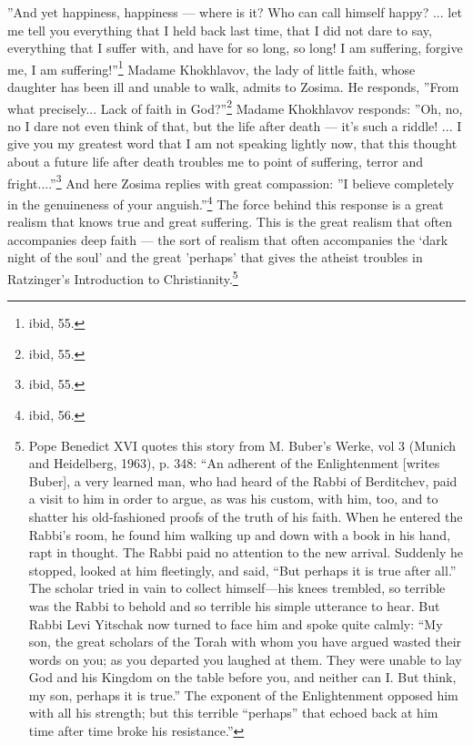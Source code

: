''And yet happiness, happiness --- where is it? Who can call himself happy? ... let me tell you everything that I held back last time, that I did not dare to say, everything that I suffer with, and have for so long, so long! I am suffering, forgive me, I am suffering!''\footnote{ibid, 55.} Madame Khokhlavov, the lady of little faith, whose daughter has been ill and unable to walk, admits to Zosima. He responds, ''From what precisely... Lack of faith in God?''\footnote{ibid, 55.} Madame Khokhlavov responds: ''Oh, no, no I dare not even think of that, but the life after death --- it's such a riddle! ... I give you my greatest word that I am not speaking lightly now, that this thought about a future life after death troubles me to point of suffering, terror and fright....''\footnote{ibid, 55.} And here Zosima replies with great compassion: ''I believe completely in the genuineness of your anguish.''\footnote{ibid, 56.} The force behind this response is a great realism that knows true and great suffering. This is the great realism that often accompanies deep faith --- the sort of realism that often accompanies the `dark night of the soul' and the great 'perhaps' that gives the atheist troubles in Ratzinger's Introduction to Christianity.\footnote{Pope Benedict XVI quotes this story from M. Buber's Werke, vol 3 (Munich and Heidelberg, 1963), p. 348: ``An adherent of the Enlightenment [writes Buber], a very learned man, who had heard of the Rabbi of Berditchev, paid a visit to him in order to argue, as was his custom, with him, too, and to shatter his old-fashioned proofs of the truth of his faith. When he entered the Rabbi's room, he found him walking up and down with a book in his hand, rapt in thought. The Rabbi paid no attention to the new arrival. Suddenly he stopped, looked at him fleetingly, and said, ``But perhaps it is true after all.'' The scholar tried in vain to collect himself---his knees trembled, so terrible was the Rabbi to behold and so terrible his simple utterance to hear. But Rabbi Levi Yitschak now turned to face him and spoke quite calmly: ``My son, the great scholars of the Torah with whom you have argued wasted their words on you; as you departed you laughed at them. They were unable to lay God and his Kingdom on the table before you, and neither can I. But think, my son, perhaps it is true.'' The exponent of the Enlightenment opposed him with all his strength; but this terrible ``perhaps'' that echoed back at him time after time broke his resistance.''}

